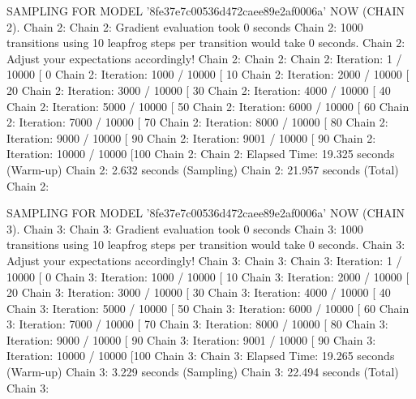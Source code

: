 \documentclass[
]{jss}
\begin{document}
\begin{CodeChunk}
\begin{CodeOutput}
SAMPLING FOR MODEL '8fe37e7c00536d472caee89e2af0006a' NOW (CHAIN 2).
Chain 2: 
Chain 2: Gradient evaluation took 0 seconds
Chain 2: 1000 transitions using 10 leapfrog steps per transition would take 0 seconds.
Chain 2: Adjust your expectations accordingly!
Chain 2: 
Chain 2: 
Chain 2: Iteration:    1 / 10000 [  0%
Chain 2: Iteration: 1000 / 10000 [ 10%
Chain 2: Iteration: 2000 / 10000 [ 20%
Chain 2: Iteration: 3000 / 10000 [ 30%
Chain 2: Iteration: 4000 / 10000 [ 40%
Chain 2: Iteration: 5000 / 10000 [ 50%
Chain 2: Iteration: 6000 / 10000 [ 60%
Chain 2: Iteration: 7000 / 10000 [ 70%
Chain 2: Iteration: 8000 / 10000 [ 80%
Chain 2: Iteration: 9000 / 10000 [ 90%
Chain 2: Iteration: 9001 / 10000 [ 90%
Chain 2: Iteration: 10000 / 10000 [100%
Chain 2: 
Chain 2:  Elapsed Time: 19.325 seconds (Warm-up)
Chain 2:                2.632 seconds (Sampling)
Chain 2:                21.957 seconds (Total)
Chain 2: 

SAMPLING FOR MODEL '8fe37e7c00536d472caee89e2af0006a' NOW (CHAIN 3).
Chain 3: 
Chain 3: Gradient evaluation took 0 seconds
Chain 3: 1000 transitions using 10 leapfrog steps per transition would take 0 seconds.
Chain 3: Adjust your expectations accordingly!
Chain 3: 
Chain 3: 
Chain 3: Iteration:    1 / 10000 [  0%
Chain 3: Iteration: 1000 / 10000 [ 10%
Chain 3: Iteration: 2000 / 10000 [ 20%
Chain 3: Iteration: 3000 / 10000 [ 30%
Chain 3: Iteration: 4000 / 10000 [ 40%
Chain 3: Iteration: 5000 / 10000 [ 50%
Chain 3: Iteration: 6000 / 10000 [ 60%
Chain 3: Iteration: 7000 / 10000 [ 70%
Chain 3: Iteration: 8000 / 10000 [ 80%
Chain 3: Iteration: 9000 / 10000 [ 90%
Chain 3: Iteration: 9001 / 10000 [ 90%
Chain 3: Iteration: 10000 / 10000 [100%
Chain 3: 
Chain 3:  Elapsed Time: 19.265 seconds (Warm-up)
Chain 3:                3.229 seconds (Sampling)
Chain 3:                22.494 seconds (Total)
Chain 3: 


\end{CodeOutput}
\end{CodeChunk}
\end{document}
